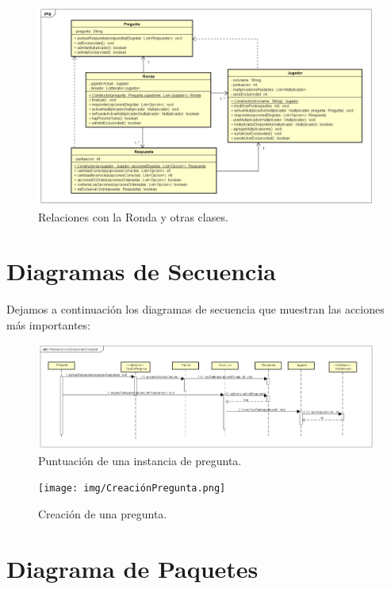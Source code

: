 \documentclass[titlepage,a4paper]{article}
\begin{document}
\begin{figure}[H]
\centering
\includegraphics[width=1\textwidth]{img/UMLClases6.png}
\caption{\label{fig:class01}Relaciones con la Ronda y otras clases.}
\end{figure}

\newpage
\section{Diagramas de Secuencia}

Dejamos a continuación los diagramas de secuencia que muestran las acciones más importantes:

\begin{figure}[H]
\centering
\includegraphics[width=1\textwidth]{img/Exclusividad Completo.png}
\caption{\label{fig:class01}Puntuación de una instancia de pregunta.}
\end{figure}

\begin{figure}[H]
\centering
\texttt{[image: img/CreaciónPregunta.png]}
\caption{\label{fig:class01}Creación de una pregunta.}
\end{figure}

\section{Diagrama de Paquetes}
\end{document}
